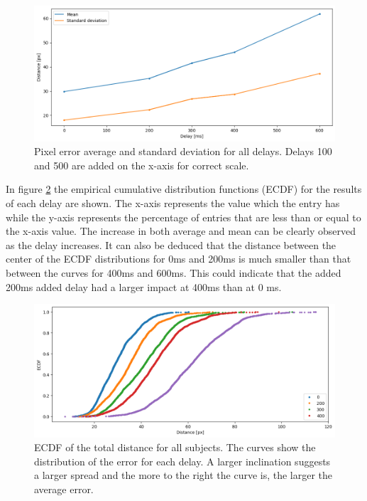 \documentclass[nofilelist]{cslthse-msc}
\begin{document}
\begin{figure}[!hbt]
   \centering
   \includegraphics[scale=0.5]{images/avg-std.png} 
   \caption{Pixel error average and standard deviation for all delays. Delays 100 and 500 are added on the x-axis for correct scale.}
   \label{fig:avg-std}
\end{figure}

In figure \ref{fig:ecdf} the empirical cumulative distribution functions (ECDF) for the results of each delay are shown. The x-axis represents the value which the entry has while the y-axis represents the percentage of entries that are less than or equal to the x-axis value. The increase in both average and mean can be clearly observed as the delay increases. It can also be deduced that the distance between the center of the ECDF distributions for 0ms and 200ms is much smaller than that between the curves for 400ms and 600ms. This could indicate that the added 200ms added delay had a larger impact at 400ms than at 0 ms.

\begin{figure}[!hbt]
   \centering
   \includegraphics[scale=0.5]{images/ecdf.png} 
   \caption{ECDF of the total distance for all subjects. The curves show the distribution of the error for each delay. A larger inclination suggests a larger spread and the more to the right the curve is, the larger the average error.}
   \label{fig:ecdf}
\end{figure}
\end{document}

